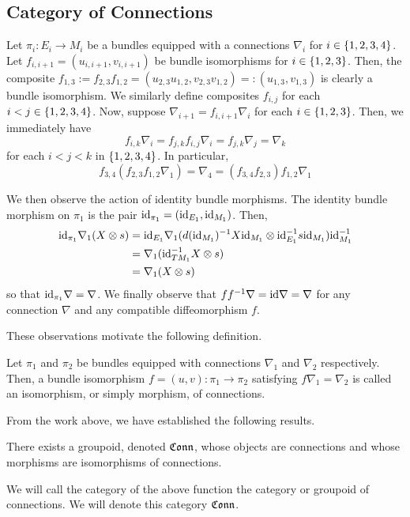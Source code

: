 \documentclass[./Thick_TQFTs_and_Quantum_Information.tex]{subfiles}
\begin{document}
\subsection{Category of Connections}\label{subsec:connctg}

Let $\pi_i : E_i \to M_i$ be a bundles equipped with a connections $\nabla_i$
for $i \in \set{1, 2, 3, 4}$. Let $f_{i, i + 1} = (u_{i, i + 1}, v_{i, i + 1})$
be bundle isomorphisms for $i \in \set{1, 2, 3}$. Then, the composite
$f_{1, 3} := f_{2, 3}f_{1, 2} = (u_{2, 3}u_{1, 2}, v_{2, 3}v_{1, 2})
=: (u_{1, 3}, v_{1, 3})$ is clearly a bundle isomorphism. We similarly define
composites $f_{i, j}$ for each $i < j \in \set{1, 2, 3, 4}$. Now, suppose
$\nabla_{i + 1} = f_{i, i + 1}\nabla_i$ for each $i \in \set{1, 2, 3}$. Then, we
immediately have
\[
  f_{i, k}\nabla_i = f_{j, k}f_{i, j}\nabla_i = f_{j, k}\nabla_j = \nabla_k
\]
for each $i < j < k$ in $\set{1, 2, 3, 4}$. In particular,
\[
  f_{3, 4}(f_{2, 3}f_{1, 2}\nabla_1) = \nabla_4
    = (f_{3, 4}f_{2, 3})f_{1, 2}\nabla_1
\]

We then observe the action of identity bundle morphisms. The identity bundle
morphism on $\pi_1$ is the pair $\text{id}_{\pi_1} = (\text{id}_{E_1}, \text{id}_{M_1})$. Then,
\begin{align*}
   \text{id}_{\pi_1}\nabla_1(X \otimes s)
&= \text{id}_{E_1}\nabla_1(d(\text{id}_{M_1})^{-1}X\text{id}_{M_1}
                     \otimes \text{id}_{E_1}^{-1}s\text{id}_{M_1})\text{id}_{M_1}^{-1} \\
&= \nabla_1(\text{id}_{TM_1}^{-1}X \otimes s) \\
&= \nabla_1(X \otimes s)
\end{align*}
so that $\text{id}_{\pi_1}\nabla = \nabla$. We finally observe that
$ff^{-1}\nabla = \text{id}\nabla = \nabla$ for any connection $\nabla$ and any
compatible diffeomorphism $f$.

These observations motivate the following definition.
\begin{defn}
Let $\pi_1$ and $\pi_2$ be bundles equipped with connections $\nabla_1$ and
$\nabla_2$ respectively. Then, a bundle isomorphism
$f = (u, v) : \pi_1 \to \pi_2$ satisfying $f\nabla_1 = \nabla_2$ is called an
isomorphism, or simply morphism, of connections.
\end{defn}

From the work above, we have established the following results.
\begin{thm}
There exists a groupoid, denoted $\mathfrak{Conn}$, whose objects are connections and
whose morphisms are isomorphisms of connections.
\end{thm}
\begin{defn}
We will call the category of the above function the category or groupoid of
connections. We will denote this category $\mathfrak{Conn}$.
\end{defn}
\end{document}

